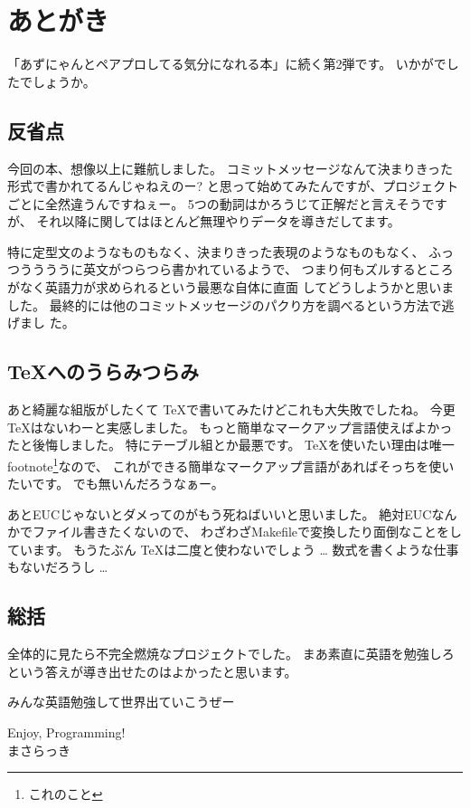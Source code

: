 \documentclass{jarticle}
\begin{document}
  \newpage
   \section*{あとがき}
  「あずにゃんとペアプロしてる気分になれる本」に続く第2弾です。
  いかがでしたでしょうか。

  \subsection*{反省点}
  今回の本、想像以上に難航しました。
  コミットメッセージなんて決まりきった形式で書かれてるんじゃねえのー?
  と思って始めてみたんですが、プロジェクトごとに全然違うんですねぇー。
  5つの動詞はかろうじて正解だと言えそうですが、
  それ以降に関してはほとんど無理やりデータを導きだしてます。

  特に定型文のようなものもなく、決まりきった表現のようなものもなく、
  ふっつううううに英文がつらつら書かれているようで、
  つまり何もズルするところがなく英語力が求められるという最悪な自体に直面
  してどうしようかと思いました。
  最終的には他のコミットメッセージのパクり方を調べるという方法で逃げまし
  た。

  \subsection*{\TeX へのうらみつらみ}
  あと綺麗な組版がしたくて \TeX で書いてみたけどこれも大失敗でしたね。
  今更 \TeX はないわーと実感しました。
  もっと簡単なマークアップ言語使えばよかったと後悔しました。
  特にテーブル組とか最悪です。
  \TeX を使いたい理由は唯一footnote\footnote{これのこと}なので、
  これができる簡単なマークアップ言語があればそっちを使いたいです。
  でも無いんだろうなぁー。

  あとEUCじゃないとダメってのがもう死ねばいいと思いました。
  絶対EUCなんかでファイル書きたくないので、
  わざわざMakefileで変換したり面倒なことをしています。
  もうたぶん \TeX は二度と使わないでしょう \dots
  数式を書くような仕事もないだろうし \dots

  \subsection*{総括}
  全体的に見たら不完全燃焼なプロジェクトでした。
  まあ素直に英語を勉強しろという答えが導き出せたのはよかったと思います。

  みんな英語勉強して世界出ていこうぜー

  \begin{flushright}
   Enjoy, Programming!\\
   \large{まさらっき}
  \end{flushright}
\end{document}
